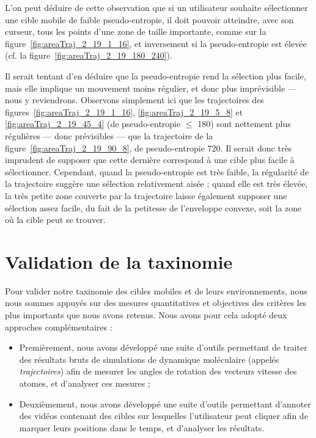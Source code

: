 	L'on peut déduire de cette observation que si un utilisateur souhaite sélectionner une cible mobile de faible pseudo-entropie, il doit pouvoir atteindre, avec son curseur, tous les points d'une zone de taille importante, comme sur la figure~\ref{fig:areaTraj_2_19_1_16}, et inversement si la pseudo-entropie est élevée (cf. la figure~\ref{fig:areaTraj_2_19_180_240}).
	
	Il serait tentant d'en déduire que la pseudo-entropie rend la sélection plus facile, mais elle implique un mouvement moins régulier, et donc plus imprévisible --- nous y reviendrons. Observons simplement ici que les trajectoires des figures~\ref{fig:areaTraj_2_19_1_16}, \ref{fig:areaTraj_2_19_5_8} et \ref{fig:areaTraj_2_19_45_4} (de pseudo-entropie $\leq$ 180) sont nettement plus régulières --- donc prévisibles --- que la trajectoire de la figure~\ref{fig:areaTraj_2_19_90_8}, de pseudo-entropie 720. Il serait donc très imprudent de supposer que cette dernière correspond à une cible plus facile à sélectionner. Cependant, quand la pseudo-entropie est très faible, la régularité de la trajectoire suggère une sélection relativement aisée ; quand elle est très élevée, la très petite zone couverte par la trajectoire laisse également supposer une sélection assez facile, du fait de la petitesse de l'enveloppe convexe, soit la zone où la cible peut se trouver.
	
	\section{Validation de la taxinomie}
	Pour valider notre taxinomie des cibles mobiles et de leurs environnements, nous nous sommes appuyés sur des mesures quantitatives et objectives des critères les plus importants que nous avons retenus. Nous avons pour cela adopté deux approches complémentaires :
	
	\begin{itemize}
		\item Premièrement, nous avons développé une suite d'outils permettant de traiter des résultats bruts de simulations de dynamique moléculaire (appelés \emph{trajectoires}) afin de mesurer les angles de rotation des vecteurs vitesse des atomes, et d'analyser ces mesures ;
		\item Deuxièmement, nous avons développé une suite d'outils permettant d'annoter des vidéos contenant des cibles sur lesquelles l'utilisateur peut cliquer afin de marquer leurs positions dans le temps, et d'analyser les résultats.
	\end{itemize}

